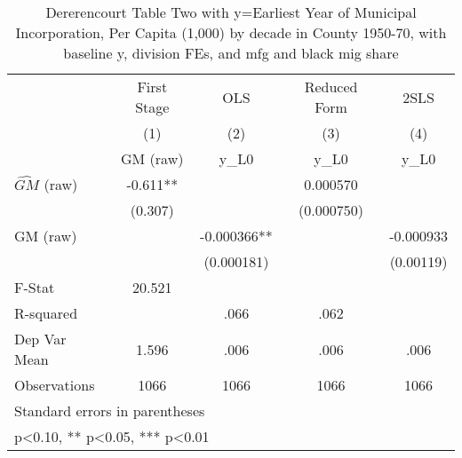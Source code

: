 \begin{table}[htbp]\centering
\def\sym#1{\ifmmode^{#1}\else\(^{#1}\)\fi}
\caption{Dererencourt Table Two with y=Earliest Year of Municipal Incorporation, Per Capita (1,000) by decade in County 1950-70, with baseline y, division FEs, and mfg and black mig share}
\begin{tabular}{l*{4}{c}}
\toprule
                    & First Stage   &         OLS   &Reduced Form   &        2SLS   \\
                    &\multicolumn{1}{c}{(1)}&\multicolumn{1}{c}{(2)}&\multicolumn{1}{c}{(3)}&\multicolumn{1}{c}{(4)}\\
                    &\multicolumn{1}{c}{GM  (raw)}&\multicolumn{1}{c}{y\_L0}&\multicolumn{1}{c}{y\_L0}&\multicolumn{1}{c}{y\_L0}\\
\midrule
$\hat{GM}$ (raw)    &      -0.611** &               &    0.000570   &               \\
                    &     (0.307)   &               &  (0.000750)   &               \\
\addlinespace
GM  (raw)           &               &   -0.000366** &               &   -0.000933   \\
                    &               &  (0.000181)   &               &   (0.00119)   \\
\midrule
F-Stat              &      20.521   &               &               &               \\
R-squared           &               &        .066   &        .062   &               \\
Dep Var Mean        &       1.596   &        .006   &        .006   &        .006   \\
Observations        &        1066   &        1066   &        1066   &        1066   \\
\bottomrule
\multicolumn{5}{l}{\footnotesize Standard errors in parentheses}\\
\multicolumn{5}{l}{\footnotesize * p<0.10, ** p<0.05, *** p<0.01}\\
\end{tabular}
\end{table}
